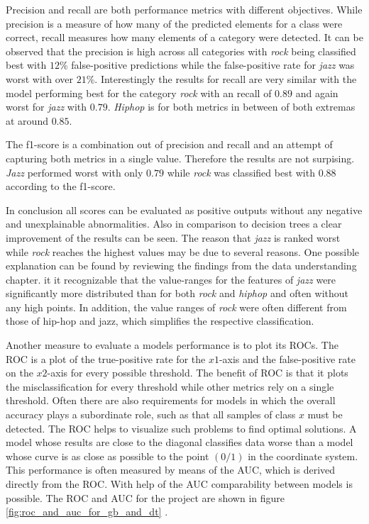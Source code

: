 Precision and recall are both performance metrics with different objectives. While precision is a measure of how many of the 
predicted elements for a class were correct, recall measures how many elements of a category were detected. It can be observed that 
the precision is high across all categories with \emph{rock} being classified best with \(12\)\% false-positive predictions while 
the false-positive rate for \emph{jazz} was worst with over \(21\)\%. Interestingly the results for recall are very similar with the model 
performing best for the category \emph{rock} with an recall of \(0.89\) and again worst for \emph{jazz} with \(0.79\). \emph{Hiphop} is for both metrics in 
between of both extremas at around \(0.85\). 

The f1-score is a combination out of precision and recall and an attempt of capturing both metrics in a single value. Therefore
the results are not surpising. \emph{Jazz} performed worst with only \(0.79\) while \emph{rock} was classified best with \(0.88\) according to the 
f1-score. 

In conclusion all scores can be evaluated as positive outputs without any negative and unexplainable abnormalities. Also in comparison 
to decision trees a clear improvement of the results can be seen. The reason that \emph{jazz} is ranked worst while \emph{rock} reaches the 
highest values may be due to several reasons. One possible explanation can be found by reviewing the findings from the data 
understanding chapter. it it recognizable that the value-ranges for the features of \emph{jazz} were significantly more distributed 
than for both \emph{rock} and \emph{hiphop} and often without any high points. In addition, the value ranges of \emph{rock} were often different from 
those of hip-hop and jazz, which simplifies the respective classification. 

Another measure to evaluate a models performance is to plot its \ac{ROC}s. The \ac{ROC} is a plot of the true-positive
rate for the \(x1\)-axis and the false-positive rate on the \(x2\)-axis for every possible threshold. The benefit of \ac{ROC} is that it plots the 
misclassification for every threshold while other metrics rely on a single threshold. Often there are also requirements for 
models in which the overall accuracy plays a subordinate role, such as that all samples of class \(x\) must be detected. The \ac{ROC} helps 
to visualize such problems to find optimal solutions. A model whose results are close to the diagonal classifies data worse than a 
model whose curve is as close as possible to the point \((0/1)\) in the coordinate system. This performance is often measured by means of 
the \ac{AUC}, which is derived directly from the \ac{ROC}. With help of the \ac{AUC} comparability between models is possible. The \ac{ROC} and \ac{AUC} for 
the project are shown in figure \ref{fig:roc_and_auc_for_gb_and_dt} \cite[p.862f]{fawcett2006introduction} \cite{scikit-roc_and_auc}.

